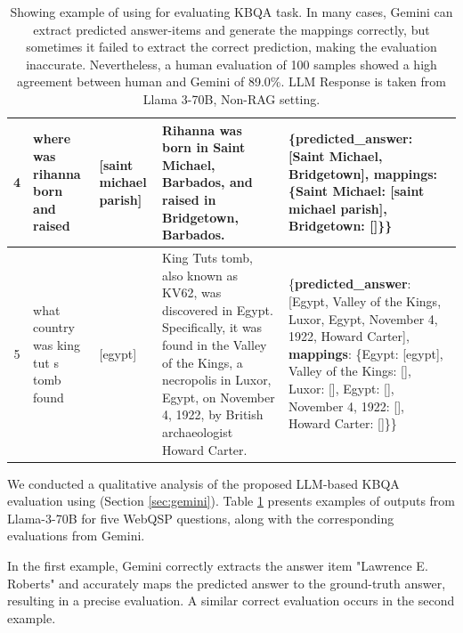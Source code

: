 \begin{table}[]
{\begin{tabular}{c|p{}|p{}|p{}|p{}}
4   & where was rihanna born and raised      & {[}saint michael parish{]}                 & Rihanna was born in Saint   Michael, Barbados, and raised in Bridgetown, Barbados.                                                                                                                                   & \{\textbf{predicted\_answer}: {[}Saint   Michael, Bridgetown{]}, \textbf{mappings}: \{Saint Michael: {[}saint michael parish{]},   Bridgetown: {[}{]}\}\}                                                                                                                    \\\midrule
5   & what country was king tut s tomb found & {[}egypt{]}                                & King Tuts tomb, also known as   KV62, was discovered in Egypt. Specifically, it was found in the Valley of   the Kings, a necropolis in Luxor, Egypt, on November 4, 1922, by British   archaeologist Howard Carter. & \{\textbf{predicted\_answer}: {[}Egypt,   Valley of the Kings, Luxor, Egypt, November 4, 1922, Howard Carter{]},   \textbf{mappings}: \{Egypt: {[}egypt{]}, Valley of the Kings: {[}{]}, Luxor: {[}{]}, Egypt: {[}{]},   November 4, 1922: {[}{]}, Howard Carter: {[}{]}\}\} \\\bottomrule
\end{tabular}}
\caption{Showing example of using \gemini for evaluating KBQA task. In many cases, Gemini can extract predicted answer-items and generate the mappings correctly, but sometimes it failed to extract the correct prediction, making the evaluation inaccurate. Nevertheless, a human evaluation of 100 samples showed a high agreement between human and Gemini of 89.0\%. LLM Response is taken from Llama 3-70B, Non-RAG setting.}
\label{tab:gemini-eval}
\end{table}

We conducted a qualitative analysis of the proposed LLM-based KBQA evaluation using \gemini (Section \ref{sec:gemini}). Table \ref{tab:gemini-eval} presents examples of outputs from Llama-3-70B for five WebQSP questions, along with the corresponding evaluations from Gemini. 

In the first example, Gemini correctly extracts the answer item "Lawrence E. Roberts" and accurately maps the predicted answer to the ground-truth answer, resulting in a precise evaluation. A similar correct evaluation occurs in the second example.

